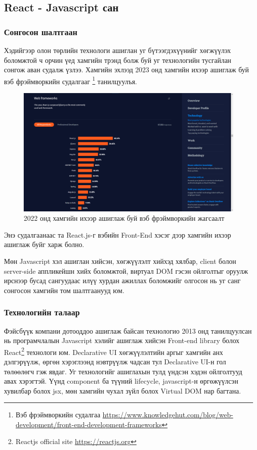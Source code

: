 \subsection{React - Javascript сан}

\subsubsection{Сонгосон шалтгаан}

Хэдийгээр олон төрлийн технологи ашиглан уг бүтээгдэхүүнийг хөгжүүлэх боломжтой ч орчин үед хамгийн трэнд болж буй уг технологийн тусгайлан сонгож аван судалж үзлээ. Хамгийн эхлээд 2023 онд хамгийн ихээр ашиглаж буй вэб фрэймворкийн судалгааг \footnote{Вэб фрэймворкийн судалгаа \url{https://www.knowledgehut.com/blog/web-development/front-end-development-frameworks}} танилцуулъя.

\begin{figure}[h]
	\centering
	\includegraphics[width=12cm]{images/most-used-frameworks.png}
	\caption{2022 онд хамгийн ихээр ашиглаж буй вэб фрэймворкийн жагсаалт}
	\label{fig:most-used-frameworks}
\end{figure}

Энэ судалгаанаас та React.js-г вэбийн Front-End хэсэг дээр хамгийн ихээр ашиглаж буйг харж болно.

Мөн Javascript хэл ашиглан хийсэн, хөгжүүлэлт хийхэд хялбар, client болон server-side аппликейшн хийх боломжтой, виртуал DOM гэсэн ойлголтыг оруулж ирснээр бусад сангуудаас илүү хурдан ажиллах боломжийг олгосон нь уг санг сонгосон хамгийн том шалтгаанууд юм.

\subsubsection{Технологийн талаар}

Фэйсбүүк компани дотооддоо ашиглаж байсан технологио 2013 онд танилцуулсан нь програмчлалын Javascript хэлийг ашиглаж хийсэн Front-end library болох React\footnote{Reactjs official site \url{https://reactjs.org}} технологи юм. Declarative UI хөгжүүлэлтийн аргыг хамгийн анх дэлгэрүүлж, өргөн хэрэглээнд нэвтрүүлж чадсан тул Declarative UI-н гол төлөөлөгч гэж явдаг. Уг технологийг ашиглахын тулд үндсэн хэдэн ойлголтууд авах хэрэгтэй. Үүнд component ба түүний lifecycle, javascript-н өргөжүүлсэн хувилбар болох jsx, мөн хамгийн чухал зүйл болох Virtual DOM нар багтана.

